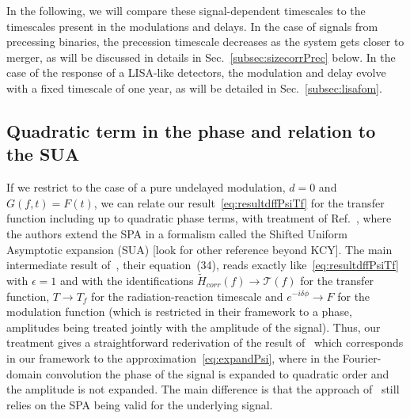 \documentclass[aps,showpacs,twocolumn,
prd,superscriptaddress,nofootinbib]{revtex4-1}
\newcommand\calT{{\mathcal{T}}}
\newcommand{\Tf}{T_{f}}
\newcommand{\SM}[1]{{\color{Red} #1}}
\newcommand{\jgb}[1]{{\color{DarkGreen} #1}}
\begin{document}
In the following, we will compare these signal-dependent timescales to the timescales present in the modulations and delays. In the case of signals from precessing binaries, the precession timescale decreases as the system gets closer to merger, as will be discussed in details in Sec.~\ref{subsec:sizecorrPrec} below. In the case of the response of a LISA-like detectors, the modulation and delay evolve with a fixed timescale of one year, as will be detailed in Sec.~\ref{subsec:lisafom}.


\subsection{Quadratic term in the phase and relation to the SUA}
\label{subsec:resumquadphase}

If we restrict to the case of a pure undelayed modulation, $d=0$ and $G(f,t) = F(t)$, we can relate our result~\eqref{eq:resultdffPsiTf} \jgb{for the transfer function including up to quadratic phase terms, with treatment} of Ref.~\cite{KCY14}, where the authors extend the SPA in a formalism called the Shifted Uniform Asymptotic expansion (SUA) \SM{[look for other reference beyond KCY]}.
The main intermediate result of~\cite{KCY14}, their equation~(34), reads exactly like~\eqref{eq:resultdffPsiTf} with $\epsilon=1$ and with the identifications $\tilde{H}_{corr}(f)\rightarrow \calT(f)$ for the transfer function, $T\rightarrow \Tf$ for the radiation-reaction timescale and $e^{-i\delta\phi} \rightarrow F$ for the modulation function (which is restricted in their framework to a phase, amplitudes being treated jointly with the amplitude of the signal). Thus, our treatment gives a straightforward rederivation of the result of~\cite{KCY14} which corresponds in our framework to the approximation~\eqref{eq:expandPsi}, where in the Fourier-domain convolution the phase of the signal is expanded to quadratic order and the amplitude is not expanded. The main difference is that the approach of~\cite{KCY14} still relies on the SPA being valid for the underlying signal.
\end{document}
